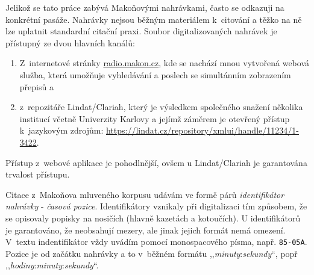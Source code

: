 Jelikož se tato práce zabývá Makoňovými nahrávkami, často se odkazuji na
konkrétní pasáže. Nahrávky nejsou běžným materiálem k~citování a těžko na ně lze
uplatnit standardní citační praxi. Soubor digitalizovaných nahrávek je
přístupný ze dvou hlavních kanálů:
\begin{enumerate}
\item{
  Z~internetové stránky \url{radio.makon.cz}, kde se nachází mnou vytvořená
  webová služba, která umožňuje vyhledávání a poslech se simultánním zobrazením
  přepisů a
}
\item{
  z~repozitáře Lindat/Clariah, který je výsledkem společného snažení několika
  institucí včetně Univerzity Karlovy a jejímž záměrem je otevřený přístup
  k~jazykovým zdrojům: \url{https://lindat.cz/repository/xmlui/handle/11234/1-3422}.
}
\end{enumerate}
Přístup z~webové aplikace je pohodlnější, ovšem u Lindat/Clariah je garantována
trvalost přístupu.

Citace z~Makoňova mluveného korpusu udávám ve formě párů \textit{identifikátor
nahrávky} - \textit{časová pozice}. Identifikátory vznikaly při digitalizaci tím
způsobem, že se opisovaly popisky na nosičích (hlavně kazetách a kotoučích). U
identifikátorů je garantováno, že neobsahují mezery, ale jinak jejich formát
nemá omezení. V~textu indentifikátor vždy uvádím pomocí monospacového písma, např.
\texttt{85-05A}. Pozice je od začátku nahrávky a to v~běžném formátu
,,\textit{minuty}:\textit{sekundy}``, popř
,,\textit{hodiny}:\textit{minuty}:\textit{sekundy}``.
